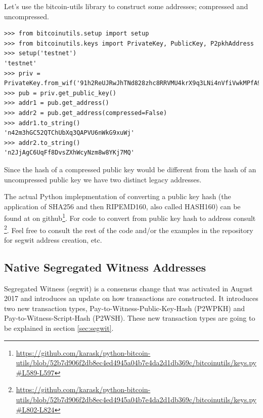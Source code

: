 Let's use the bitcoin-utils library to construct some addresses; compressed and uncompressed.

\vspace{1em}
\begin{lstlisting}[style=Python,label={lst:display-addresses},caption={Python example to generate compressed and uncompressed addresses},captionpos=b]
>>> from bitcoinutils.setup import setup
>>> from bitcoinutils.keys import PrivateKey, PublicKey, P2pkhAddress
>>> setup('testnet')
'testnet' 
>>> priv = PrivateKey.from_wif('91h2ReUJRwJhTNd828zhc8RRVMU4krX9q3LNi4nVfiVwkMPfA9p')
>>> pub = priv.get_public_key()  
>>> addr1 = pub.get_address()
>>> addr2 = pub.get_address(compressed=False)
>>> addr1.to_string()
'n42m3hGC52QTChUbXq3QAPVU6nWkG9xuWj' 
>>> addr2.to_string() 
'n2JjAgC6UqFf8DvsZXhWcyNzm8w8YKj7MQ'
\end{lstlisting}
\vspace{1em}

\begin{note}
Since the hash of a compressed public key would be different from the hash of an uncompressed public key we have two distinct legacy addresses.
\end{note}

The actual Python implepmentation of converting a public key hash (the application of SHA256 and then RIPEMD160, also called HASH160) can be found at  on github\footnote{\url{https://github.com/karask/python-bitcoin-utils/blob/52b7d906f2db8ec4ed4945a04b7e4da2d1db369c/bitcoinutils/keys.py\#L589-L597}}. For code to convert from public key hash to address consult \footnote{\url{https://github.com/karask/python-bitcoin-utils/blob/52b7d906f2db8ec4ed4945a04b7e4da2d1db369c/bitcoinutils/keys.py\#L802-L824}}. Feel free to consult the rest of the code and/or the examples in the repository for segwit address creation, etc.


\subsection*{Native Segregated Witness Addresses}

Segregated Witness (segwit) is a consensus change that was activated in August 2017 and introduces an update on how transactions are constructed. It introduces two new transaction types, Pay-to-Witness-Public-Key-Hash (P2WPKH) and Pay-to-Witness-Script-Hash (P2WSH). These new transaction types are going to be explained in section \ref{sec:segwit}.

